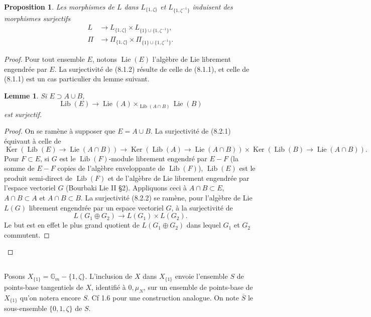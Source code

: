 \documentclass[11pt,a4paper]{article}
\theoremstyle{plain}
\newtheorem{lemma}[theorem]{Lemme}
\newtheorem{proposition}[theorem]{Proposition}
\theoremstyle{definition}
\DeclareMathOperator{\Ker}{Ker}
\DeclareMathOperator{\Lie}{Lie}
\DeclareMathOperator{\Lib}{Lib}
\newcommand{\Gm}{\mathbb{G}_m}
\begin{document}
\begin{proposition}\label{prop:8.1}
Les morphismes de $L$ dans $L_{\{1,\zeta\}}$ et $L_{\{1,\zeta^{-1}\}}$ induisent des morphismes surjectifs
\begin{align}
L &\to L_{\{1,\zeta\}} \times L_{\{1\} \cup \{1,\zeta^{-1}\}}, \label{eq:8.1.1}\\
\Pi &\to \Pi_{\{1,\zeta\}} \times \Pi_{\{1\} \cup \{1,\zeta^{-1}\}}. \label{eq:8.1.2}
\end{align}
\end{proposition}

\begin{proof}
Pour tout ensemble $E$, notons $\Lie(E)$ l'alg\`ebre de Lie librement engendr\'ee par $E$. La surjectivit\'e de (8.1.2) r\'esulte de celle de (8.1.1), et celle de (8.1.1) est un cas particulier du lemme suivant.

\begin{lemma}\label{lem:8.2}
Si $E \supset A \cup B$,
\begin{equation}\label{eq:8.2.1}
\Lib(E) \to \Lie(A) \times_{\Lib(A \cap B)} \Lie(B)
\end{equation}
est surjectif.
\end{lemma}

\begin{proof}
On se ram\`ene \`a supposer que $E = A \cup B$. La surjectivit\'e de (8.2.1) \'equivaut \`a celle de
\begin{equation}\label{eq:8.2.2}
\Ker(\Lib(E) \to \Lie(A \cap B)) \to \Ker(\Lib(A) \to \Lie(A \cap B)) \times \Ker(\Lib(B) \to \Lie(A \cap B)).
\end{equation}
Pour $F \subset E$, si $G$ est le $\Lib(F)$-module librement engendr\'e par $E - F$ (la somme de $E - F$ copies de l'alg\`ebre enveloppante de $\Lib(F)$), $\Lib(E)$ est le produit semi-direct de $\Lib(F)$ et de l'alg\`ebre de Lie librement engendr\'ee par l'espace vectoriel $G$ (Bourbaki Lie II \S 2). Appliquons ceci \`a $A \cap B \subset E$, $A \cap B \subset A$ et $A \cap B \subset B$. La surjectivit\'e (8.2.2) se ram\`ene, pour l'alg\`ebre de Lie $L(G)$ librement engendr\'ee par un espace vectoriel $G$, \`a la surjectivit\'e de
\[
L(G_1 \oplus G_2) \to L(G_1) \times L(G_2).
\]
Le but est en effet le plus grand quotient de $L(G_1 \oplus G_2)$ dans lequel $G_1$ et $G_2$ commutent.
\end{proof}
\end{proof}

\subsection{}
Posons $X_{\{1\}} = \Gm - \{1, \zeta\}$. L'inclusion de $X$ dans $X_{\{1\}}$ envoie l'ensemble $S$ de points-base tangentiels de $X$, identifi\'e \`a $0, \mu_N$, sur un ensemble de points-base de $X_{\{1\}}$ qu'on notera encore $S$. Cf 1.6 pour une construction analogue. On note $\overline{S}$ le sous-ensemble $\{0, 1, \zeta\}$ de $S$.
\end{document}
